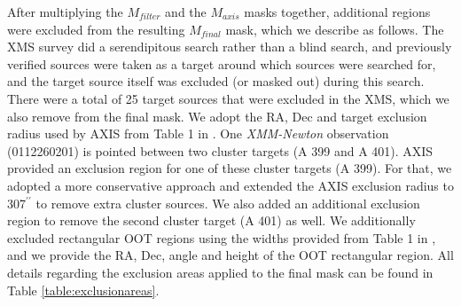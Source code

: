 \documentclass[fleqn,usenatbib]{mnras}
\begin{document}
        After multiplying the $M_{filter}$ and the $M_{axis}$ masks together, additional regions were excluded from the resulting $M_{final}$ mask, which we describe as follows.
        The XMS survey did a serendipitous search rather than a blind search, and previously verified sources were taken as a target around which sources were searched for, and the target source itself was excluded (or masked out) during this search. 
        There were a total of 25 target sources that were excluded in the XMS, which we also remove from the final mask.
        We adopt the RA, Dec and target exclusion radius used by AXIS from Table 1 in \cite{carrera2007xmm}. 
        One \textit{XMM-Newton} observation (0112260201) is pointed between two cluster targets (A 399 and A 401). 
        AXIS provided an exclusion region for one of these cluster targets (A 399). 
        For that, we adopted a more conservative approach and extended the AXIS exclusion radius to 307$^{\prime\prime}$ to remove extra cluster sources.
        We also added an additional exclusion region to remove the second cluster target (A 401) as well. 
        We additionally excluded rectangular OOT regions using the widths provided from Table 1 in \cite{carrera2007xmm}, and we provide the RA, Dec, angle and height of the OOT rectangular region.
        All details regarding the exclusion areas applied to the final mask can be found in Table \ref{table:exclusionareas}.
        
\end{document}
